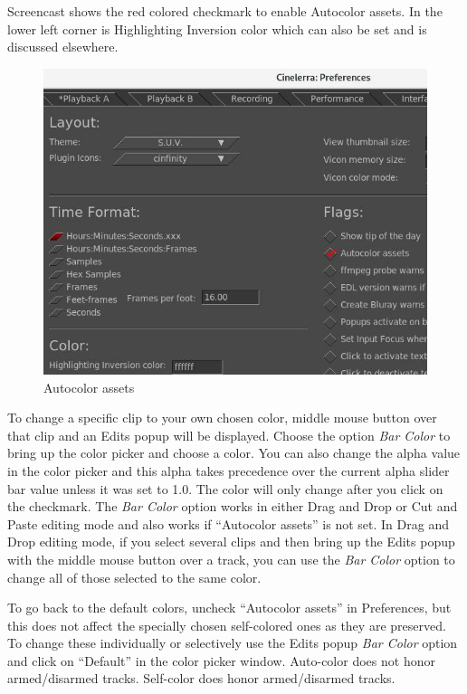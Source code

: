Screencast shows the red colored checkmark to enable Autocolor assets.  
In the lower left corner is Highlighting Inversion color which can also be set and is discussed elsewhere.

\begin{figure}[htpb]
    \centering
    \includegraphics[width=0.8\linewidth]{images/autocolor-assets.png}
    \caption{Autocolor assets}
    \label{fig:autocolor_assets}
\end{figure}

To change a specific clip to your own chosen color, middle mouse button over that clip and an Edits popup will be displayed.  
Choose the option \emph{Bar Color} to bring up the color picker and choose a color.   
You can also change the alpha value in the color picker and this alpha takes precedence over the current alpha slider bar value unless it was set to 1.0.   
The color will only change after you click on the checkmark.  
The \emph{Bar Color} option works in either Drag and Drop or Cut and Paste editing mode and also works if “Autocolor assets” is not set.  
In Drag and Drop editing mode, if you select several clips and then bring up the Edits popup with the middle mouse button over a track, you can use the \emph{Bar Color} option to change all of those selected to the same color.

To go back to the default colors, uncheck “Autocolor assets” in Preferences, but this does not affect the specially chosen self-colored ones as they are preserved.  
To change these individually or  selectively use the Edits popup \emph{Bar Color} option and click on “Default” in the color picker window.  Auto-color does not honor armed/disarmed tracks.  
Self-color does honor armed/disarmed tracks.

